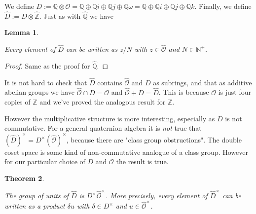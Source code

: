 \documentclass[10pt,a4paper]{article}
\newcommand{\Z}{\mathbb{Z}}
\newcommand{\N}{\mathbb{N}}
\newcommand{\Q}{\mathbb{Q}}
\newcommand{\Qhat}{\widehat{\Q}}
\newcommand{\calO}{\mathcal{O}}
\newcommand{\calOhat}{\widehat{\calO}}
\newcommand{\Zhat}{\widehat{\Z}}
\newcounter{chapter}
\newtheorem{theorem}{Theorem}[chapter]
\newtheorem{lemma}[theorem]{Lemma}
\newcommand{\uses}[1]{}
\newcommand{\lean}[1]{}
\newcommand{\leanok}{}
\begin{document}
We define $D:=\Q\otimes\calO=\Q\oplus\Q i\oplus\Q j\oplus\Q\omega=\Q\oplus\Q i\oplus\Q j\oplus\Q k$.
Finally, we define $\widehat{D}:=D\otimes\Zhat$. Just as with $\Qhat$ we have

\begin{lemma}
    \label{HurwitzRatHat.canonicalForm}
    \lean{HurwitzRatHat.canonicalForm}
    \uses{QHat, ZHat, Hurwitz}
    \leanok
    Every element of $\widehat{D}$ can be written as $z/N$ with $z\in\calOhat$ and $N\in\N^+$.
\end{lemma}
\begin{proof}
    Same as the proof for $\Qhat$.
\end{proof}

It is not hard to check that $\widehat{D}$ contains $\widehat{\calO}$
and $D$ as subrings, and that as additive abelian groups we have
$\widehat{\calO}\cap D=\calO$ and $\widehat{\calO}+D=\widehat{D}$.
This is because $\calO$ is just four copies of $\Z$ and we've proved
the analogous result for $\Z$.

However the multiplicative structure is more interesting, especially
as $D$ is not commutative. For a general quaternion algebra it is \emph{not}
true that $(\widehat{D})^\times=D^\times(\widehat{\calO})^\times$, because
there are "class group obstructions". The double coset space is some
kind of non-commutative analogue of a class group. However for our
particular choice of $D$ and $\calO$ the result is true.


\begin{theorem}
    \label{HurwitzRatHat.completed_units}
    \lean{HurwitzRatHat.completed_units}
    \uses{HurwitzRatHat.canonicalForm}
    \leanok
    The group of units of $\widehat{D}$ is $D^\times\calOhat^\times$.
    More precisely, every element of $\widehat{D}^\times$ can be written as a product $\delta u$
    with $\delta\in D^\times$ and $u\in\calOhat^\times$.
\end{theorem}
\end{document}
